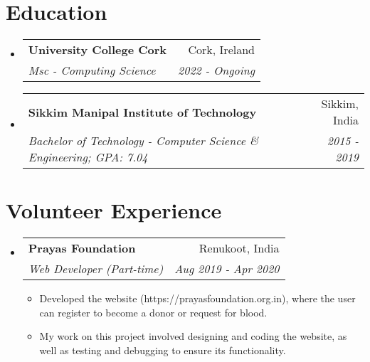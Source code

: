 \documentclass[a4paper,20pt]{article}
\makeatletter
\newcommand{\resumeItemWithoutTitle}[1]{
  \item\small{
    {#1\vspace{-2pt}}
  }
}
\newcommand{\resumeSubheading}[4]{
  \vspace{-1pt}\item
    \begin{tabular*}{0.97\textwidth}{l@{\extracolsep{\fill}}r}
      \textbf{#1} & #2 \\
      \textit{#3} & \textit{#4} \\
    \end{tabular*}\vspace{-5pt}
}
\newcommand{\resumeSubHeadingListStart}{\begin{itemize}[leftmargin=*]}
\newcommand{\resumeSubHeadingListEnd}{\end{itemize}}
\newcommand{\resumeItemListStart}{\begin{itemize}}
\newcommand{\resumeItemListEnd}{\end{itemize}\vspace{-5pt}}
\makeatother
\begin{document}
\section{Education}
\resumeSubHeadingListStart
\resumeSubheading
{University College Cork}{Cork, Ireland}
{Msc - Computing Science}{2022 - Ongoing}
\vspace{2pt}
\resumeSubheading
{Sikkim Manipal Institute of Technology}{Sikkim, India}
{Bachelor of Technology - Computer Science \& Engineering;  GPA: 7.04}{2015 - 2019}
\resumeSubHeadingListEnd
\vspace{-5pt}

\section{Volunteer Experience}
\resumeSubHeadingListStart
\resumeSubheading{Prayas Foundation}{Renukoot, India}
{Web Developer (Part-time)}{Aug 2019 - Apr 2020}
\resumeItemListStart
\resumeItemWithoutTitle{Developed the website (https://prayasfoundation.org.in), where the user can register to become a donor or request for blood.}
\resumeItemWithoutTitle{My work on this project involved designing and coding the website, as well as testing and debugging to ensure its functionality.}
\resumeItemListEnd
\resumeSubHeadingListEnd
\end{document}
